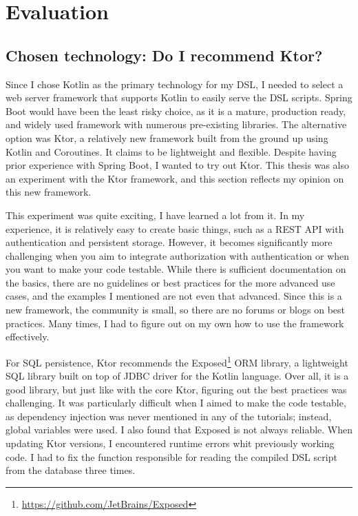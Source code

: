 \section{Evaluation}

\subsection[Chosen technology]{Chosen technology: Do I recommend Ktor?}
\label{sec:ktor2}

Since I chose Kotlin as the primary technology for my DSL, I needed to select a web server framework that supports Kotlin to easily serve the DSL scripts. Spring Boot would have been the least risky choice, as it is a mature, production ready, and widely used framework with numerous pre-existing libraries. The alternative option was Ktor, a relatively new framework built from the ground up using Kotlin and Coroutines. It claims to be lightweight and flexible. Despite having prior experience with Spring Boot, I wanted to try out Ktor. This thesis was also an experiment with the Ktor framework, and this section reflects my opinion on this new framework.

This experiment was quite exciting, I have learned a lot from it. In my experience, it is relatively easy to create basic things, such as a REST API with authentication and persistent storage. However, it becomes significantly more challenging when you aim to integrate authorization with authentication or when you want to make your code testable. While there is sufficient documentation on the basics, there are no guidelines or best practices for the more advanced use cases, and the examples I mentioned are not even that advanced. Since this is a new framework, the community is small, so there are no forums or blogs on best practices. Many times, I had to figure out on my own how to use the framework effectively.

For SQL persistence, Ktor recommends the Exposed\footnote{\url{https://github.com/JetBrains/Exposed}} ORM library, a lightweight SQL library built on top of JDBC driver for the Kotlin language. Over all, it is a good library, but just like with the core Ktor, figuring out the best practices was challenging. It was particularly difficult when I aimed to make the code testable, as dependency injection was never mentioned in any of the tutorials; instead, global variables were used. I also found that Exposed is not always reliable. When updating Ktor versions, I encountered runtime errors whit previously working code. I had to fix the function responsible for reading the compiled DSL script from the database three times.

